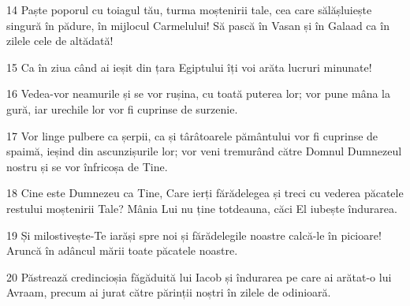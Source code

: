 \par 14 Paște poporul cu toiagul tău, turma moștenirii tale, cea care sălășluiește singură în pădure, în mijlocul Carmelului! Să pască în Vasan și în Galaad ca în zilele cele de altădată!
\par 15 Ca în ziua când ai ieșit din țara Egiptului îți voi arăta lucruri minunate!
\par 16 Vedea-vor neamurile și se vor rușina, cu toată puterea lor; vor pune mâna la gură, iar urechile lor vor fi cuprinse de surzenie.
\par 17 Vor linge pulbere ca șerpii, ca și târâtoarele pământului vor fi cuprinse de spaimă, ieșind din ascunzișurile lor; vor veni tremurând către Domnul Dumnezeul nostru și se vor înfricoșa de Tine.
\par 18 Cine este Dumnezeu ca Tine, Care ierți fărădelegea și treci cu vederea păcatele restului moștenirii Tale? Mânia Lui nu ține totdeauna, căci El iubește îndurarea.
\par 19 Și milostivește-Te iarăși spre noi și fărădelegile noastre calcă-le în picioare! Aruncă în adâncul mării toate păcatele noastre.
\par 20 Păstrează credincioșia făgăduită lui Iacob și îndurarea pe care ai arătat-o lui Avraam, precum ai jurat către părinții noștri în zilele de odinioară.



